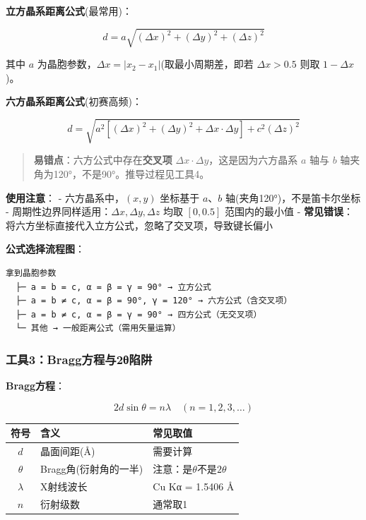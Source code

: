 \documentclass[a4paper,11pt]{ctexart}
\newcounter{none}
\newcommand{\箭}{\ensuremath{\rightarrow}}
\newcommand{\左箭}{\ensuremath{\leftarrow}}
\newcommand{\上箭}{\ensuremath{\uparrow}}
\newcommand{\下箭}{\ensuremath{\downarrow}}
\newcommand{\衡}{\ensuremath{\rightleftharpoons}}
\newcommand{\双箭}{\ensuremath{\leftrightarrow}}
\newcommand{\约等于}{\ensuremath{\approx}}
\newcommand{\小于等于}{\ensuremath{\leq}}
\newcommand{\大于等于}{\ensuremath{\geq}}
\newcommand{\不等于}{\ensuremath{\neq}}
\newcommand{\西格马}{\ensuremath{\sigma}}
\newcommand{\派}{\ensuremath{\pi}}
\begin{document}
\textbf{立方晶系距离公式}(最常用)：

\[d = a\sqrt{(\Delta x)^2 + (\Delta y)^2 + (\Delta z)^2}\]

其中 \(a\) 为晶胞参数，\(\Delta x = |x_2 - x_1|\)(取最小周期差，即若 \(\Delta x > 0.5\) 则取 \(1 - \Delta x\))。

\textbf{六方晶系距离公式}(初赛高频)：

\[d = \sqrt{a^2[(\Delta x)^2 + (\Delta y)^2 + \Delta x \cdot \Delta y] + c^2(\Delta z)^2}\]

\begin{quote}
\textbf{易错点}：六方公式中存在\textbf{交叉项} \(\Delta x \cdot \Delta y\)，这是因为六方晶系 \(a\) 轴与 \(b\) 轴夹角为120°，不是90°。推导过程见工具4。
\end{quote}

\textbf{使用注意}：
- 六方晶系中，\((x, y)\) 坐标基于 \(a\)、\(b\) 轴(夹角120°)，不是笛卡尔坐标
- 周期性边界同样适用：\(\Delta x, \Delta y, \Delta z\) 均取 \([0, 0.5]\) 范围内的最小值
- \textbf{常见错误}：将六方坐标直接代入立方公式，忽略了交叉项，导致键长偏小

\textbf{公式选择流程图}：

\begin{verbatim}
拿到晶胞参数
  ├─ a = b = c, α = β = γ = 90° → 立方公式
  ├─ a = b ≠ c, α = β = 90°, γ = 120° → 六方公式（含交叉项）
  ├─ a = b ≠ c, α = β = γ = 90° → 四方公式（无交叉项）
  └─ 其他 → 一般距离公式（需用矢量运算）
\end{verbatim}

\subsubsection{工具3：Bragg方程与2θ陷阱}\label{ux5de5ux51773braggux65b9ux7a0bux4e0e2ux3b8ux9677ux9631}

\textbf{Bragg方程}：

\[2d\sin\theta = n\lambda \quad (n = 1, 2, 3, \ldots)\]

{\def\LTcaptype{none} %
\begin{longtable}[]{@{}cll@{}}
\toprule\noalign{}
符号 & 含义 & 常见取值 \\
\midrule\noalign{}
\endhead
\bottomrule\noalign{}
\endlastfoot
\(d\) & 晶面间距(Å) & 需要计算 \\
\(\theta\) & Bragg角(衍射角的一半) & 注意：是\(\theta\)不是\(2\theta\) \\
\(\lambda\) & X射线波长 & Cu Kα = 1.5406 Å \\
\(n\) & 衍射级数 & 通常取1 \\
\end{longtable}
}
\end{document}
